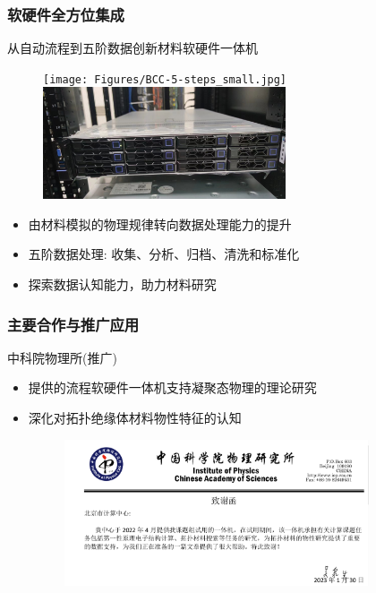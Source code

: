 \begin{frame}
	\frametitle{软硬件全方位集成}
	从自动流程到五阶数据创新材料软硬件一体机
\begin{figure}[h!]
\centering
\texttt{[image: Figures/BCC-5-steps\_small.jpg]}
\includegraphics[height=1.30in]{Figures/BCC-5-step_Model-Machines.jpg}
\label{BCC-5-steps}
\end{figure}
\begin{itemize}
	\item 由材料模拟的物理规律转向数据处理能力的提升
	\item 五阶数据处理: 收集、分析、归档、清洗和标准化
	\item 探索数据认知能力，助力材料研究
\end{itemize}
\end{frame}


\begin{frame}
	\frametitle{主要合作与推广应用}
中科院物理所(推广)
	\begin{itemize}
	 \setlength{\itemsep}{10pt}
		\item 提供的流程软硬件一体机支持凝聚态物理的理论研究
		\item 深化对拓扑绝缘体材料物性特征的认知%
\begin{figure}[h!]
\centering
\vskip 5pt
\includegraphics[height=1.7in]{Figures/Acknowledge-IP_CAS-BCC.png}
\label{Acknowleges-IP_CAS}
\end{figure}
	\end{itemize}
\end{frame}

